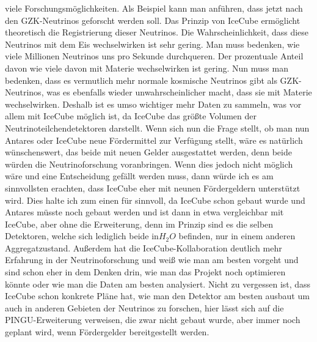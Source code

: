     viele Forschungsmöglichkeiten. Als Beispiel kann man anführen, dass jetzt nach den GZK-Neutrinos 
    geforscht werden soll. Das Prinzip von IceCube ermöglicht theoretisch die Registrierung dieser Neutrinos. 
    Die Wahrscheinlichkeit, dass diese Neutrinos mit dem Eis wechselwirken ist sehr gering. Man muss bedenken, 
    wie viele Millionen Neutrinos uns pro Sekunde durchqueren. Der prozentuale Anteil davon wie viele davon mit 
    Materie wechselwirken ist gering. Nun muss man bedenken, dass es vermutlich mehr normale kosmische 
    Neutrinos gibt als GZK-Neutrinos, was es ebenfalls wieder unwahrscheinlicher macht, dass sie mit 
    Materie wechselwirken. Deshalb ist es umso wichtiger mehr Daten zu sammeln, was vor allem mit IceCube 
    möglich ist, da IceCube das größte Volumen der Neutrinoteilchendetektoren darstellt. Wenn sich nun die 
    Frage stellt, ob man nun Antares oder IceCube neue Fördermittel zur Verfügung stellt, wäre es natürlich 
    wünschenswert, das beide mit neuen Gelder ausgestattet werden, denn beide würden die Neutrinoforschung 
    voranbringen. Wenn dies jedoch nicht möglich wäre und eine Entscheidung gefällt werden muss, dann würde 
    ich es am sinnvollsten erachten, dass IceCube eher mit neunen Fördergeldern unterstützt wird. Dies halte 
    ich zum einen für sinnvoll, da IceCube schon gebaut wurde und Antares müsste noch gebaut werden und ist 
    dann in etwa vergleichbar mit IceCube, aber ohne die Erweiterung, denn im Prinzip sind es die selben 
    Detektoren, welche sich lediglich beide in$H_2O$ befinden, nur in einem anderen Aggregatzustand. Außerdem 
    hat die IceCube-Kollaboration deutlich mehr Erfahrung in der Neutrinoforschung und weiß wie man am besten
    vorgeht und sind schon eher in dem Denken drin, wie man das Projekt noch optimieren könnte oder wie man die 
    Daten am besten analysiert. Nicht zu vergessen ist, dass IceCube schon konkrete Pläne hat, wie man den 
    Detektor am besten ausbaut um auch in anderen Gebieten der Neutrinos zu forschen, hier lässt sich auf die 
    PINGU-Erweiterung verweisen, die zwar nicht gebaut wurde, aber immer noch geplant wird, wenn Fördergelder 
    bereitgestellt werden. \cite{Neutrino14}

